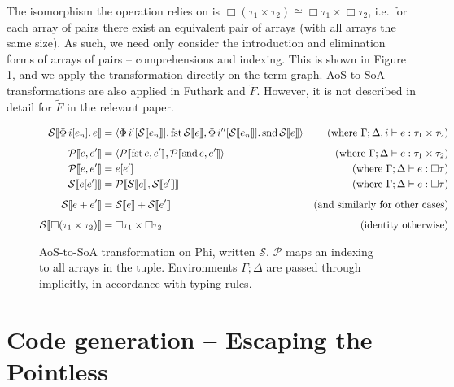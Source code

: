 The isomorphism the operation relies on is $\Box (\tau_1 \times \tau_2) \cong \Box \tau_1 \times \Box \tau_2$, i.e. for each array of pairs there exist an equivalent pair of arrays (with all arrays the same size). As such, we need only consider the introduction and elimination forms of arrays of pairs -- comprehensions and indexing. This is shown in Figure \ref{fig:aos-to-soa}, and we apply the transformation directly on the term graph. AoS-to-SoA transformations are also applied in Futhark and $\tilde F$. However, it is not described in detail for $\tilde F$ in the relevant paper.

\newcommand{\phisoa}[1]{\mathcal S \left\llbracket {#1} \right\rrbracket}
\newcommand{\phitupleindex}[2]{\mathcal P \left\llbracket {#1}, {#2} \right\rrbracket}

\begin{figure}[h]
    \centering
    \begin{align*}
\phisoa {\phivec{i}{e_n}{e}}
&= \phipair{\phivec{i'}{\phisoa{e_n}}{\phifst{\phisoa{e}}}}{\phivec{i''}{\phisoa{e_n}}{\phisnd{\phisoa{e}}}}
&\text{(where }\Gamma; \Delta, i \vdash e : \phipairtype{\tau_1}{\tau_2} \text{)} \\[0.5em]
\phitupleindex{e}{e'}
&= \phipair{\phitupleindex{\phifst{e}}{e'}}{\phitupleindex{\phisnd{e}}{e'}}
&\text{(where }\Gamma; \Delta \vdash e : \phipairtype{\tau_1}{\tau_2} \text{)} \\
\phitupleindex{e}{e'}
&= e\left[ e' \right]
&\text{(where }\Gamma; \Delta \vdash e : \phivectype{\tau} \text{)} \\
\phisoa{e[e']}
&= \phitupleindex{\phisoa{e}}{\phisoa{e'}}
&\text{(where }\Gamma; \Delta \vdash e : \phivectype{\tau} \text{)} \\[0.5em]
\phisoa{e + e'}
&= \phisoa{e} + \phisoa{e'}
&\text{(and similarly for other cases)} \\[0.5em]
\phisoa{\phivectype{(\phipairtype{\tau_1}{\tau_2}})} &= \phipairtype{\phivectype{\tau_1}}{\phivectype{\tau_2}} &\text{(identity otherwise)}
    \end{align*}
    \caption{AoS-to-SoA transformation on Phi, written $\mathcal S$. $\mathcal P$ maps an indexing to all arrays in the tuple. Environments $\Gamma; \Delta$ are passed through implicitly, in accordance with typing rules.}
    \label{fig:aos-to-soa}
\end{figure}

\section{Code generation -- Escaping the Pointless}

